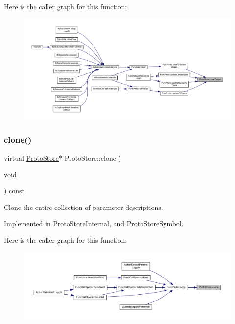 Here is the caller graph for this function\+:
\nopagebreak
\begin{figure}[H]
\begin{center}
\leavevmode
\includegraphics[width=350pt]{class_proto_store_a02928f3bab6c98f728a1759e3127e5c4_icgraph}
\end{center}
\end{figure}
\mbox{\label{class_proto_store_aaefd44fa7803bbeb4d91059cc6480419}} 
\subsubsection{\texorpdfstring{clone()}{clone()}}
{\footnotesize\ttfamily virtual \mbox{\hyperlink{class_proto_store}{Proto\+Store}}$\ast$ Proto\+Store\+::clone (\begin{DoxyParamCaption}\item[{void}]{ }\end{DoxyParamCaption}) const\hspace{0.3cm}{\ttfamily [pure virtual]}}



Clone the entire collection of parameter descriptions. 



Implemented in \mbox{\hyperlink{class_proto_store_internal_ac14aea73b6e7381a6751a1bcf98c1930}{Proto\+Store\+Internal}}, and \mbox{\hyperlink{class_proto_store_symbol_aa6631290325889edb7ef7699fdd8a90f}{Proto\+Store\+Symbol}}.

Here is the caller graph for this function\+:
\nopagebreak
\begin{figure}[H]
\begin{center}
\leavevmode
\includegraphics[width=350pt]{class_proto_store_aaefd44fa7803bbeb4d91059cc6480419_icgraph}
\end{center}
\end{figure}
\mbox{\label{class_proto_store_a97623d0ed5720f94d7c671edccbd9142}} 
